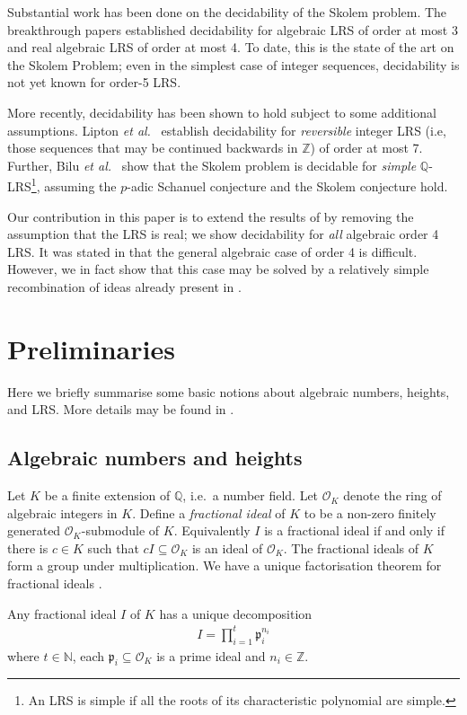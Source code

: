 \documentclass{theoretics}
\newcommand{\Q}{\mathbb{Q}}
\newcommand{\p}{\mathfrak{p}}
\newcommand{\Z}{\mathbb{Z}}
\newcommand{\N}{\mathbb{N}}
\renewcommand{\O}{\mathcal{O}}
\begin{document}
Substantial work has been done on the decidability of the Skolem problem. The breakthrough papers \cite{Vereshchagin,Mignotte_distance} established decidability for algebraic LRS of order at most 3 and real algebraic LRS of order at most 4. To date, this is the state of the art on the Skolem Problem; even in the simplest case of integer sequences, decidability is not yet known for order-5 LRS. 

More recently, decidability has been shown to hold subject to some additional assumptions. Lipton \emph{et al.}\ \cite{Lipton_2022} establish decidability for \emph{reversible} integer LRS (i.e, those sequences that may be continued backwards in $\Z$) of order at most 7. Further, Bilu \emph{et al.}\ \cite{Yuri_2023} show that the Skolem problem is decidable for \emph{simple} $\Q$-LRS\footnote{An LRS is simple if all the roots of its characteristic polynomial are simple.}, assuming the $p$-adic Schanuel conjecture and the Skolem conjecture hold. 
	
Our contribution in this paper is to extend the results of \cite{Vereshchagin,Mignotte_distance} by removing the assumption that the LRS is real; we show decidability for \emph{all} algebraic order 4 LRS. It was stated in \cite[p. 33]{Chonev} that the general algebraic case of order 4 is difficult. However, we in fact show that this case may be solved by a relatively simple recombination of ideas already present in \cite{Vereshchagin,Mignotte_distance}.

 \section{Preliminaries}\label{Prelim}
 Here we briefly summarise some basic notions about algebraic numbers, heights, and LRS. More details may be found in \cite{neukirch_algebraic_1999,Waldschmidt_book}.
\subsection{Algebraic numbers and heights}
 Let $K$ be a finite extension of $\Q$, i.e.\ a number field. Let $\O_K$ denote the ring of algebraic integers in $K$. Define a \emph{fractional ideal} of $K$ to be a non-zero finitely generated $\O_K$-submodule of $K$. Equivalently $I$ is a fractional ideal if and only if there is $c \in K$ such that $cI \subseteq \O_K$ is an ideal of $\O_K$. The fractional ideals of $K$ form a group under multiplication. We have a unique factorisation theorem for fractional ideals \cite[p. 22]{neukirch_algebraic_1999}.
 \begin{theorem} \label{thm:ideal_fac}
Any fractional ideal $I$ of $K$ has a unique decomposition
\begin{align*}
I = \prod_{i=1}^t \p_i^{n_i}
\end{align*}
where $t \in \N$, each $\p_i \subseteq \O_K$ is a prime ideal and $n_i \in \Z$. 
 \end{theorem}
\end{document}
